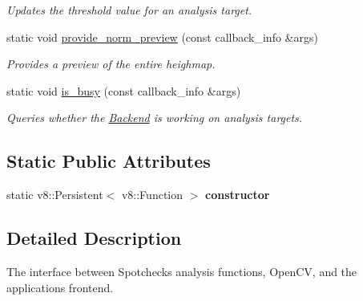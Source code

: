 \begin{DoxyCompactItemize}
\begin{DoxyCompactList}\small\item\em Updates the threshold value for an analysis target. \end{DoxyCompactList}\item 
static void \hyperlink{class_backend_a848c3f31e41690d5e27e0f260651ec9a}{provide\+\_\+norm\+\_\+preview} (const callback\+\_\+info \&args)
\begin{DoxyCompactList}\small\item\em Provides a preview of the entire heighmap. \end{DoxyCompactList}\item 
static void \hyperlink{class_backend_ad23273def503c1749707c57ac92e9212}{is\+\_\+busy} (const callback\+\_\+info \&args)
\begin{DoxyCompactList}\small\item\em Queries whether the \hyperlink{class_backend}{Backend} is working on analysis targets. \end{DoxyCompactList}\end{DoxyCompactItemize}
\subsection*{Static Public Attributes}
\begin{DoxyCompactItemize}
\item 
\mbox{\label{class_backend_a68ea10283f69788d9104a664cc44913f}} 
static v8\+::\+Persistent$<$ v8\+::\+Function $>$ {\bfseries constructor}
\end{DoxyCompactItemize}


\subsection{Detailed Description}
The interface between Spotcheck\textquotesingle{}s analysis functions, Open\+CV, and the application\textquotesingle{}s frontend. 

